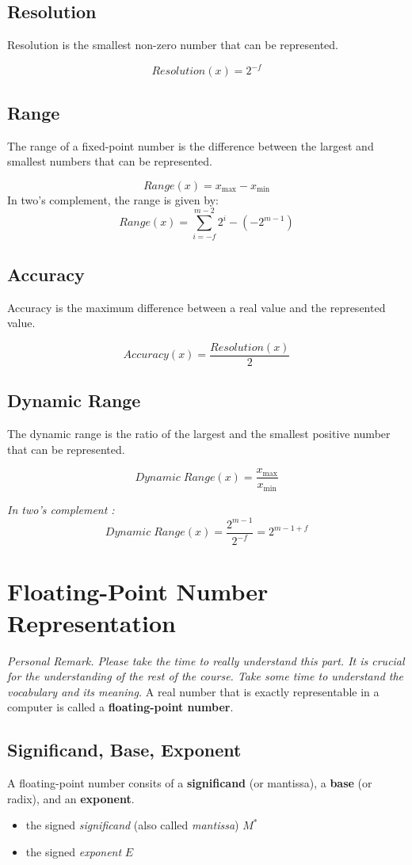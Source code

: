 \documentclass[12pt,openany, tikz,border=10pt]{book}
\begin{document}
    \subsection{Resolution}
    Resolution is the smallest non-zero number that can be represented.

    $$Resolution(x) = 2^{-f}$$


    \subsection{Range}
    The range of a fixed-point number is the difference between the largest and smallest numbers that can be represented.

    \[Range(x) = x_{\text{max}} - x_{\text{min}}\]
    \newblock
    \newline
    In two's complement, the range is given by:
    \[ Range(x) = \displaystyle\sum_{i=-f}^{m-2} 2^i - \left( -2^{m-1} \right)\]

    \subsection{Accuracy}
    Accuracy is the maximum difference between a real value and the represented value.

    $$Accuracy(x) = \frac{Resolution(x)}{2}$$

    \subsection{Dynamic Range}
    The dynamic range is the ratio of the largest and the smallest positive number that can be represented.

    $$Dynamic \; Range(x) = \frac{x_{\text{max}}}{x_{\text{min}}}$$

    \textit{In two's complement :}
    $$Dynamic \; Range(x) = \frac{2^{m-1}}{2^{-f}} = 2^{m-1+f}$$

    \section{Floating-Point Number Representation}
    \textit{Personal Remark. Please take the time to really understand this part. It is crucial for the understanding of the rest of the course. Take some time to understand the vocabulary and its meaning.}\newline
    \vskip 0.5cm
    A real number that is exactly representable in a computer is called a \textbf{floating-point number}. 
    \subsection{Significand, Base, Exponent}
    A floating-point number consits of a \textbf{significand} (or mantissa), a \textbf{base} (or radix), and an \textbf{exponent}.
\begin{itemize}
  \item[] the signed \textit{significand} (also called \textit{mantissa}) \( M^* \)
  \item[] the signed \textit{exponent} \( E \)
\end{itemize}
\end{document}
